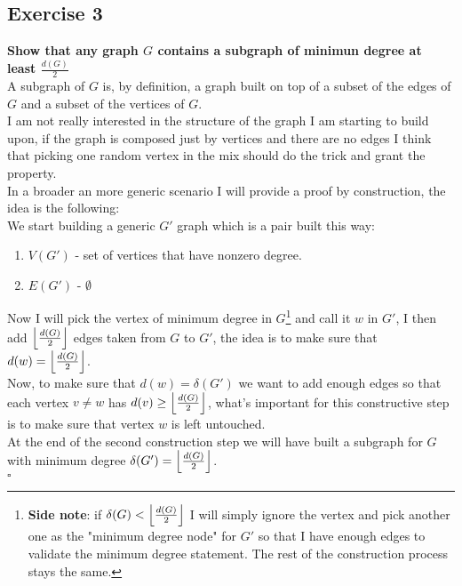 \subsection*{Exercise 3}
\boldmath
\textbf{Show that any graph $G$ contains a subgraph of minimun degree at least $\frac{d(G)}{2}$}\vspace{10pt}\\
\unboldmath
A subgraph of $G$ is, by definition, a graph built on top of a subset of the edges of $G$ and a subset of the vertices of $G$.\\
I am not really interested in the structure of the graph I am starting to build upon, if the graph is composed just by vertices and there are no edges I think that picking one random vertex in the mix should do the trick and grant the property.\\
In a broader an more generic scenario I will provide a proof by construction, the idea is the following:\\
We start building a generic $G'$ graph which is a pair built this way:
\begin{enumerate}
    \item $V(G')$ - set of vertices that have nonzero degree.
    \item $E(G')$ - $\emptyset$
\end{enumerate}
Now I will pick the vertex of minimum degree in $G$\footnote{\textbf{Side note}: if $\delta(G) < \left\lfloor\frac{d(G)}{2}\right\rfloor$ I will simply ignore the vertex and pick another one as the "minimum degree node" for $G'$ so that I have enough edges to validate the minimum degree statement. The rest of the construction process stays the same.} and call it $w$ in $G'$, I then add $\left\lfloor\frac{d(G)}{2}\right\rfloor$ edges taken from $G$ to $G'$, the idea is to make sure that $d(w) = \left\lfloor\frac{d(G)}{2}\right\rfloor$.\\
Now, to make sure that $d(w) = \delta(G')$ we want to add enough edges so that each vertex $v \neq w$ has $d(v) \geq \left\lfloor\frac{d(G)}{2}\right\rfloor$, what's important for this constructive step is to make sure that vertex $w$ is left untouched.\\
At the end of the second construction step we will have built a subgraph for $G$ with minimum degree $\delta(G') = \left\lfloor\frac{d(G)}{2}\right\rfloor$.
\vspace{2pt}\\\hspace*{2.5cm}$\square$